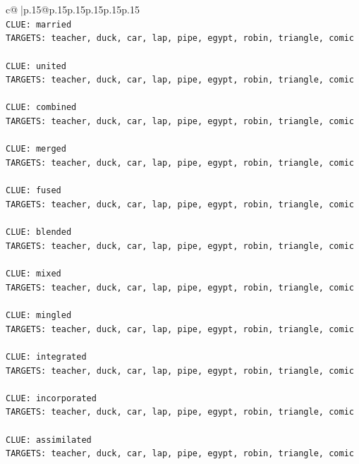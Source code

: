 \documentclass{article}
\begin{document}
{\begin{supertabular}{c@{$\;$}|p{.15\linewidth}@{}p{.15\linewidth}p{.15\linewidth}p{.15\linewidth}p{.15\linewidth}p{.15\linewidth}}
{{{\\ 
\texttt{CLUE: married} \\
\texttt{TARGETS: teacher, duck, car, lap, pipe, egypt, robin, triangle, comic} \\
\\ 
\texttt{CLUE: united} \\
\texttt{TARGETS: teacher, duck, car, lap, pipe, egypt, robin, triangle, comic} \\
\\ 
\texttt{CLUE: combined} \\
\texttt{TARGETS: teacher, duck, car, lap, pipe, egypt, robin, triangle, comic} \\
\\ 
\texttt{CLUE: merged} \\
\texttt{TARGETS: teacher, duck, car, lap, pipe, egypt, robin, triangle, comic} \\
\\ 
\texttt{CLUE: fused} \\
\texttt{TARGETS: teacher, duck, car, lap, pipe, egypt, robin, triangle, comic} \\
\\ 
\texttt{CLUE: blended} \\
\texttt{TARGETS: teacher, duck, car, lap, pipe, egypt, robin, triangle, comic} \\
\\ 
\texttt{CLUE: mixed} \\
\texttt{TARGETS: teacher, duck, car, lap, pipe, egypt, robin, triangle, comic} \\
\\ 
\texttt{CLUE: mingled} \\
\texttt{TARGETS: teacher, duck, car, lap, pipe, egypt, robin, triangle, comic} \\
\\ 
\texttt{CLUE: integrated} \\
\texttt{TARGETS: teacher, duck, car, lap, pipe, egypt, robin, triangle, comic} \\
\\ 
\texttt{CLUE: incorporated} \\
\texttt{TARGETS: teacher, duck, car, lap, pipe, egypt, robin, triangle, comic} \\
\\ 
\texttt{CLUE: assimilated} \\
\texttt{TARGETS: teacher, duck, car, lap, pipe, egypt, robin, triangle, comic} \\
\\ 
}}}
\end{supertabular}}
\end{document}
